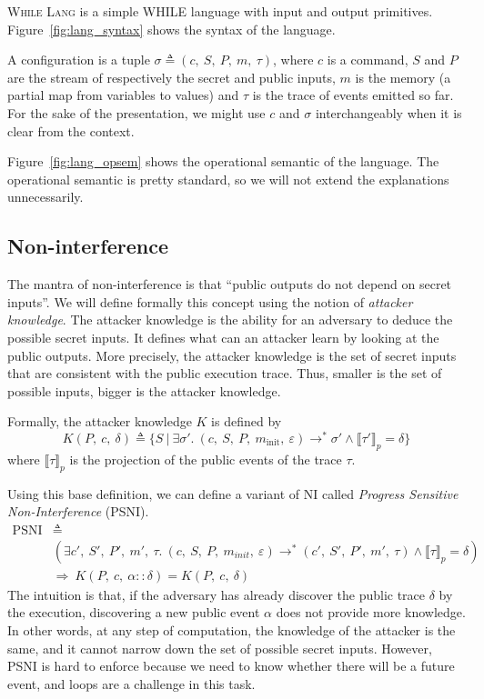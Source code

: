 \documentclass[10pt]{article}
\newcommand{\conf}{\sigma}
\newcommand{\exectrans}[2] { #1 \rightarrow^{*} #2 }
\newcommand{\whilelang}{\textsc{While Lang} }
\newcommand{\pproj}[1]{\llbracket #1 \rrbracket_{p}}
\begin{document}
\whilelang is a simple WHILE language with input and output primitives. Figure~\ref{fig:lang_syntax}
shows the syntax of the language.



A configuration is a tuple $\conf \triangleq (c,~S,~P,~m,~\tau)$, where $c$ is a command, $S$ and
$P$ are the stream of respectively the secret and public inputs, $m$ is the memory (a partial map
from variables to values) and $\tau$ is the trace of events emitted so far.
For the sake of the presentation, we might use $c$ and $\conf$ interchangeably when it is clear from
the context.

Figure~\ref{fig:lang_opsem} shows the operational semantic of the language. The operational semantic
is pretty standard, so we will not extend the explanations unnecessarily.

\subsection{Non-interference}%
\label{subsec:ni}

The mantra of non-interference is that ``public outputs do not depend on secret inputs''.
We will define formally this concept using the notion of \emph{attacker knowledge}. The attacker
knowledge is the ability for an adversary to deduce the possible secret inputs. It defines what can
an attacker learn by looking at the public outputs.
More precisely, the attacker knowledge is the set of secret inputs that are consistent with the
public execution trace. Thus, smaller is the set of possible inputs, bigger is the attacker
knowledge.

Formally, the attacker knowledge $K$ is defined by
\[
  K(P,~c,~\delta) \triangleq
  \{ S ~|~ \exists \conf'.\
  \exectrans{(c,~S,~P,~m_{\mathrm{init}},~\varepsilon)}{\conf'}
  \wedge
  \pproj{\tau'} = \delta
  \}
\]
where $\pproj{\tau}$ is the projection of the public events of the trace $\tau$.

Using this base definition, we can define a variant of NI called \emph{Progress Sensitive
  Non-Interference} (PSNI).
\begin{align*}
  \mathrm{PSNI} &\triangleq \\
  &(\exists c',~S',~P',~m',~\tau.\
  \exectrans{(c,~S,~P,~m_{init},~\varepsilon)}{(c',~S',~P',~m',~\tau)}
  \wedge
  \pproj{\tau} = \delta) \\
  &\Rightarrow
  \ K(P,~c,~\alpha::\delta) = K(P,~c,~\delta)
\end{align*}
The intuition is that, if the adversary has already discover the public trace $\delta$ by the
execution, discovering a new public event $\alpha$ does not provide more knowledge.
In other words, at any step of computation, the knowledge of the attacker is the same, and it cannot
narrow down the set of possible secret inputs.
However, PSNI is hard to enforce because we need to know whether there will be a future event, and
loops are a challenge in this task.
\end{document}
